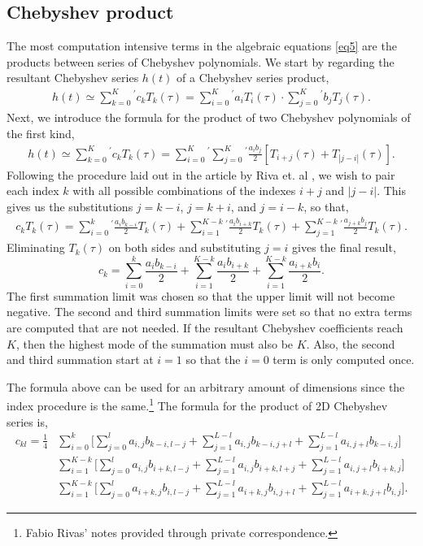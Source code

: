 \documentclass{article}
\begin{document}
\subsection{Chebyshev product}
The most computation intensive terms in the algebraic equations \ref{eq5} are the products between series of Chebyshev polynomials. We start by regarding the resultant Chebyshev series $h(t)$ of a Chebyshev series product, 
\begin{align}
h(t) \simeq \sum_{k=0}^K {}^{\prime}c_kT_k(\tau) = \sum_{i=0}^K {}^{\prime} a_iT_i(\tau) \cdot \sum_{j=0}^K {}^{\prime}b_jT_j(\tau).
\end{align}
Next, we introduce the formula for the product of two Chebyshev polynomials of the first kind,
\begin{align}
h(t) \simeq \sum_{k=0}^K {}^{\prime}c_kT_k(\tau) = \sum_{i=0}^K {}^{\prime}\sum_{j=0}^K {}^{\prime} \frac{a_ib_j}{2}[T_{i+j}(\tau)+T_{|j-i|}(\tau)].
\end{align}
Following the procedure laid out in the article by Riva et. al \cite{riva2017}, we wish to pair each index $k$ with all possible combinations of the indexes $i+j$ and $|j-i|$. This gives us the substitutions $j=k-i$, $j=k+i$, and $j=i-k$, so that,
\begin{align}
c_kT_k(\tau) = \sum_{i=0}^k {}^{\prime} \frac{a_ib_{k-i}}{2}T_k(\tau) + \sum_{i=1}^{K-k} {}^{\prime} \frac{a_ib_{i+k}}{2}T_k(\tau) + \sum_{j=1}^{K-k} {}^{\prime} \frac{a_{j+k}b_j}{2}T_k(\tau).
\end{align}
Eliminating $T_k(\tau)$ on both sides and substituting $j=i$ gives the final result,
\begin{equation}
c_k = \sum_{i=0}^k \frac{a_i b_{k-i}}{2} + \sum_{i=1}^{K-k}\frac{a_i b_{i+k}}{2} + \sum_{i=1}^{K-k}\frac{a_{i+k} b_i}{2}.
\label{1DCP}
\end{equation}
The first summation limit was chosen so that the upper limit will not become negative. The second and third summation limits were set so that no extra terms are computed that are not needed. If the resultant Chebyshev coefficients reach $K$, then the highest mode of the summation must also be $K$. Also, the second and third summation start at $i=1$ so that the $i=0$ term is only computed once.

The formula above can be used for an arbitrary amount of dimensions since the index procedure is the same.\footnote{Fabio Rivas' notes provided through private correspondence.} The formula for the product of 2D Chebyshev series is,
\begin{align}
c_{kl} = \frac{1}{4}&\sum_{i=0}^k \Bigg[\sum_{j=0}^l a_{i,j} b_{k-i,l-j} + \sum_{j=1}^{L-l} a_{i,j} b_{k-i,j+l} + \sum_{j=1}^{L-l} a_{i,j+l} b_{k-i,j}\Bigg] \\
&\sum_{i=1}^{K-k} \Bigg[\sum_{j=0}^l a_{i,j} b_{i+k,l-j} + \sum_{j=1}^{L-l} a_{i,j} b_{i+k,l+j} + \sum_{j=1}^{L-l} a_{i,j+l} b_{i+k,j} \Bigg] \nonumber \\
&\sum_{i=1}^{K-k} \Bigg[\sum_{j=0}^l a_{i+k,j} b_{i,l-j} + \sum_{j=1}^{L-l} a_{i+k,j} b_{i,j+l} + \sum_{j=1}^{L-l} a_{i+k,j+l} b_{i,j} \Bigg]. \nonumber
\label{2DCP}
\end{align}
\end{document}
